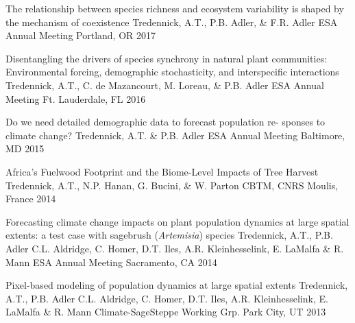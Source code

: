 

\begin{pubentries}

  \pubentry
    {The relationship between species richness and ecosystem variability is shaped by the mechanism of coexistence} %
    {Tredennick, A.T., P.B. Adler, \& F.R. Adler} %
    {ESA Annual Meeting} %
    {Portland, OR} %
    {2017} %

  \pubentry
    {Disentangling the drivers of species synchrony in natural plant communities: Environmental forcing, demographic stochasticity, and interspecific interactions} %
    {Tredennick, A.T., C. de Mazancourt, M. Loreau, \& P.B. Adler} %
    {ESA Annual Meeting} %
    {Ft. Lauderdale, FL} %
    {2016} %

  \pubentry
    {Do we need detailed demographic data to forecast population re- sponses to climate change?} %
    {Tredennick, A.T. \& P.B. Adler} %
    {ESA Annual Meeting} %
    {Baltimore, MD} %
    {2015} %

\pubentry
    {Africa’s Fuelwood Footprint and the Biome-Level Impacts of Tree Harvest} %
    {Tredennick, A.T., N.P. Hanan, G. Bucini, \& W. Parton} %
    {CBTM, CNRS} %
    {Moulis, France} %
    {2014} %


  \pubentry
    {Forecasting climate change impacts on plant population dynamics at large spatial extents: a test case with sagebrush (\emph{Artemisia}) species} %
    {Tredennick, A.T., P.B. Adler C.L. Aldridge, C. Homer, D.T. Iles, A.R. Kleinhesselink, E. LaMalfa \& R. Mann} %
    {ESA Annual Meeting} %
    {Sacramento, CA} %
    {2014} %

\pubentry
    {Pixel-based modeling of population dynamics at large spatial extents} %
    {Tredennick, A.T., P.B. Adler C.L. Aldridge, C. Homer, D.T. Iles, A.R. Kleinhesselink, E. LaMalfa \& R. Mann} %
    {Climate-SageSteppe Working Grp.} %
    {Park City, UT} %
    {2013} %


\end{pubentries}

